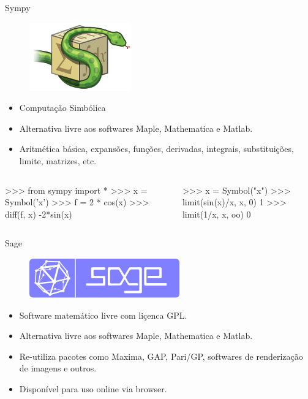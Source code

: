 \documentclass[12pt,t,graphics]{beamer}
\begin{document}

\begin{frame}[t,fragile]{Sympy}
	\begin{figure}
		\centering
		\includegraphics[scale=0.4]{img/sympylogo.png}
	\end{figure}
	\begin{itemize}
		\item Computação Simbólica
		\item Alternativa livre aos softwares Maple, Mathematica e Matlab.
		\item Aritmética básica, expansões, funções, derivadas, integrais, 
		substituições, limite, matrizes, etc.
	\end{itemize}
	\begin{columns}
		\begin{python}
>>> from sympy import *
>>> x = Symbol('x')
>>> f = 2 * cos(x)
>>> diff(f, x)
-2*sin(x)
\end{python}
\begin{python}
>>> x = Symbol("x")
>>> limit(sin(x)/x, x, 0)
1
>>> limit(1/x, x, oo)
0
		\end{python}
	\end{columns}
\end{frame}

\begin{frame}[t]{Sage}
	\begin{figure}
		\centering
		\includegraphics[scale=0.3]{img/logo_sage.png}
	\end{figure}
	\begin{itemize}
		\item Software matemático livre com liçenca GPL.
		\item Alternativa livre aos softwares Maple, Mathematica e Matlab.
		\item Re-utiliza pacotes como Maxima, GAP, Pari/GP, softwares de 
		renderização de imagens e outros.
		\item Disponível para uso online via browser.
	\end{itemize}
\end{frame}
\end{document}
